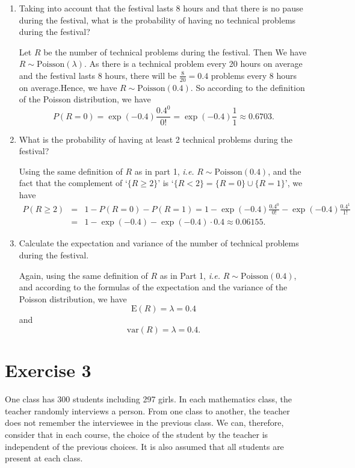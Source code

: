 \documentclass[12pt,thmsa]{article}\usepackage[]{graphicx}\usepackage[]{color}
\begin{document}
\begin{enumerate}
\item Taking into account that the festival lasts 8 hours and that there is no pause during
the festival, what is the probability of having no technical problems during the
festival?

 Let $R$ be the number of technical problems during the festival. Then We have $R\sim \text{Poisson}(\lambda)$. As there is a technical problem every 20 hours on average and the festival lasts 8 hours, there will be $\frac{8}{20}=0.4$ problems every 8 hours on average.Hence, we have $R\sim \text{Poisson}(0.4)$. So according to the definition of the Poisson distribution, we have
\begin{equation*}
P(R=0)= \exp(-0.4)\frac{0.4^0}{0!} = \exp(-0.4) \frac{1}{1} \approx 0.6703.
\end{equation*}
\item What is the probability of having at least 2 technical problems during the festival?

Using the same definition of $R$ as in part 1, {\it i.e.} $R\sim  \text{Poisson}(0.4)$, and the fact that the complement of `$\{R\geq 2\}$' is `$\{R<2\}=\{R=0\}\cup\{R=1\}$', we have
\begin{eqnarray*}
P(R\geq 2)&=& 1- P(R=0) - P(R=1) = 1 - \exp(-0.4)\frac{0.4^0}{0!}- \exp(-0.4)\frac{0.4^1}{1!} \\
&=&  1 - \exp(-0.4) - \exp(-0.4) \cdot 0.4 \approx 0.06155.
\end{eqnarray*}
\item Calculate the expectation and variance of the number of technical problems during the
festival.

Again, using the same definition of $ R $ as in Part 1, {\it i.e.} $R\sim  \text{Poisson}(0.4)$, and according to the formulas of the expectation and the variance of the Poisson distribution, we have
$$
\text{E}(R) = \lambda= 0.4
$$
and
$$
\text{var}(R) =\lambda= 0.4.
$$

\end{enumerate}

\newpage

\section*{Exercise 3}

One class has 300 students including 297 girls. In each mathematics class, the
teacher randomly interviews a person. From one class to another, the teacher does not remember the interviewee in the previous class. We can, therefore, consider that in each course, the choice of the student by the teacher is independent of the previous choices. It is also assumed that all students are present at each class.
\end{document}
